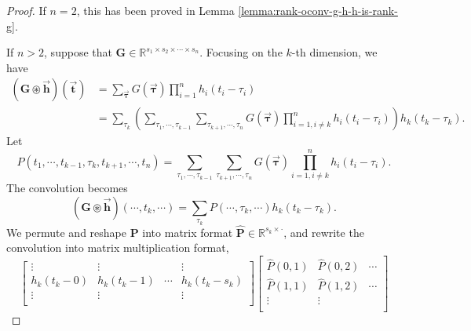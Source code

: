\documentclass[twoside,11pt]{article}
\def\oconv{\circledast}
\def\tvar#1{\mathbf{#1}} %
\def\tvarhat#1{\widehat{\mathbf{#1}}} %
\def\vsymb#1{\vec{\mathbf{#1}}}
\begin{document}
\begin{proof}
  
    If \(n=2\), this has been proved in Lemma \ref{lemma:rank-oconv-g-h-h-is-rank-g}.
  

  
    If \(n > 2\), suppose that \(\tvar{G} \in \mathbb{R}^{s_1 \times s_2 \times \cdots \times s_n}\).
    Focusing on the \(k\)-th dimension, we have
    \begin{equation*}
      \begin{aligned}
        (\tvar{G} \oconv \vsymb{h})(\vsymb{t})
         & = \sum_{\vsymb{\tau}} G(\vsymb{\tau}) \prod_{i=1}^{n} h_i(t_i - \tau_i) \\
         & = \sum_{\tau_k} \left(
        \sum_{\tau_1, \cdots, \tau_{k-1}}
        \sum_{\tau_{k+1}, \cdots, \tau_n}
        G(\vsymb{\tau}) \prod_{i=1, i \ne k}^{n} h_i(t_i - \tau_i)
        \right) h_k(t_k - \tau_k).
      \end{aligned}
    \end{equation*}
    Let
    \begin{equation*}
      P(t_1, \cdots, t_{k-1}, \tau_k, t_{k+1}, \cdots, t_n)
      = \sum_{\tau_1, \cdots, \tau_{k-1}}
      \sum_{\tau_{k+1}, \cdots, \tau_n}
      G(\vsymb{\tau}) \prod_{i=1, i \ne k}^{n} h_i(t_i - \tau_i).
    \end{equation*}
    The convolution becomes
    \begin{equation*}
      (\tvar{G} \oconv \vsymb{h})(\cdots, t_k, \cdots)
      = \sum_{\tau_k} P(\cdots, \tau_k, \cdots) h_k(t_k - \tau_k).
    \end{equation*}
    We permute and reshape \(\tvar{P}\) into matrix format \(\tvarhat{P} \in \mathbb{R}^{s_k \times \cdot}\), and rewrite the convolution into matrix multiplication format,
    \begin{equation*}
      \begin{bmatrix}
        \vdots       & \vdots     &        & \vdots         \\
        h_k(t_k - 0) & h_k(t_k-1) & \cdots & h_k(t_k - s_k) \\
        \vdots       & \vdots     &        & \vdots         \\
      \end{bmatrix}
      \begin{bmatrix}
        \hat{P}(0, 1)   & \hat{P}(0, 2)   & \cdots \\
        \hat{P}(1, 1)   & \hat{P}(1, 2)   & \cdots \\
        \vdots          & \vdots          &        \\

\end{bmatrix}
\end{equation*}
\end{proof}
\end{document}
